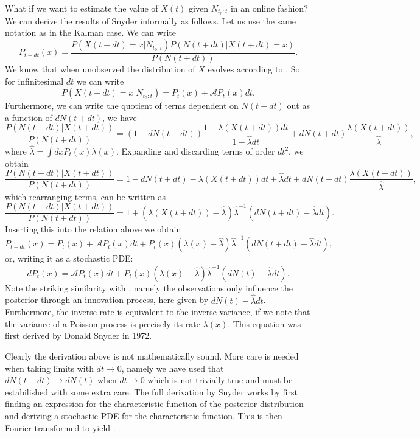 \par
What if we want to estimate the value of $X(t)$ given $N_{t_0:t}$ in an online fashion? We can derive the results of Snyder informally as follows. Let us use the same notation as in the Kalman case. We can write
\[
P_{t+dt}(x) =\frac{ P(X(t+dt)=x|N_{t_0:t})P(N(t+dt)|X(t+dt)=x)}{P(N(t+dt))}.
\]
We know that when unobserved the distribution of $X$ evolves according to . So for infinitesimal $dt$ we can write 
\[
P(X(t+dt)=x|N_{t_0:t}) = P_t(x) + \mathcal{A}P_t(x) dt.
\]
Furthermore, we can write the quotient of terms dependent on $N(t+dt)$ out as a function of $dN(t+dt)$, we have
\[
\frac{P(N(t+dt)|X(t+dt))}{P(N(t+dt))} = (1-dN(t+dt))\frac{1-\lambda(X(t+dt))dt}{1-\hat{\lambda}dt} + dN(t+dt)\frac{\lambda(X(t+dt))}{\hat{\lambda}},
\]
where $\hat{\lambda} = \int dx P_t(x) \lambda(x)$. Expanding and discarding terms of order $dt^2$, we obtain
\[
\frac{P(N(t+dt)|X(t+dt))}{P(N(t+dt))} = 1-dN(t+dt) -\lambda(X(t+dt))dt +\hat{\lambda}dt +dN(t+dt)\frac{\lambda(X(t+dt))}{\hat{\lambda}},
\]
which rearranging terms, can be written as
\[
\frac{P(N(t+dt)|X(t+dt))}{P(N(t+dt))} = 1 + \left(\lambda(X(t+dt))-\hat{\lambda}\right)\hat{\lambda}^{-1}\left(dN(t+dt)-\hat{\lambda} dt\right).
\]
Inserting this into the relation above we obtain
\[
P_{t+dt}(x) = P_t(x) +\mathcal{A} P_t(x) dt + P_t(x)\left(\lambda(x)-\hat{\lambda}\right)\hat{\lambda}^{-1}\left(dN(t+dt)-\hat{\lambda} dt\right),
\]
or, writing it as a stochastic PDE:
\begin{equation}
\label{eq:snyder_uni}
dP_t(x) = \mathcal{A}P_t(x) dt + P_t(x)\left(\lambda(x)-\hat{\lambda}\right)\hat{\lambda}^{-1}\left(dN(t)-\hat{\lambda} dt\right).
\end{equation}
Note the striking similarity with , namely the observations only influence the posterior through an innovation process, here given by $dN(t)-\hat{\lambda}dt$. Furthermore, the inverse rate is equivalent to the inverse variance, if we note that the variance of a Poisson process is precisely its rate $\lambda(x)$. This equation was first derived by Donald Snyder in 1972.\cite{Snyder1972}
\par
Clearly the derivation above is not mathematically sound. More care is needed when taking limits with $dt\to 0$, namely we have used that $dN(t+dt) \to dN(t)$ when $dt\to 0$ which is not trivially true and must be estabilished with some extra care. The full derivation by Snyder works by first finding an expression for the characteristic function of the posterior distribution and deriving a stochastic PDE for the characteristic function. This is then Fourier-transformed to yield .

